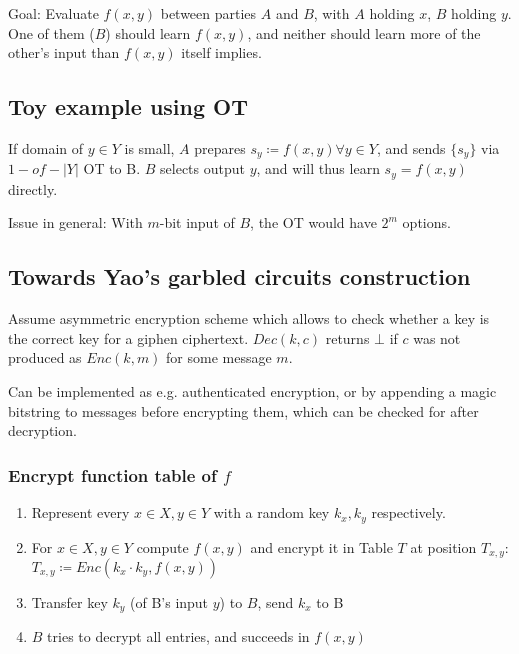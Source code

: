 Goal: Evaluate $f(x, y)$ between parties $A$ and $B$, with $A$ holding $x$, $B$
holding $y$. One of them ($B$) should learn $f(x, y)$, and neither should learn
more of the other's input than $f(x, y)$ itself implies.

\subsection{Toy example using OT}

If domain of $y \in Y$ is small, $A$ prepares $s_y \coloneqq f(x, y) \forall y
\in Y$, and sends $\{s_y\}$ via $1-of-|Y|$ OT to B. $B$ selects output $y$, and
will thus learn $s_y = f(x, y)$ directly.

Issue in general: With $m$-bit input of $B$, the OT would have $2^m$ options.

\subsection{Towards Yao's garbled circuits construction}

Assume asymmetric encryption scheme which allows to check whether a key is the
correct key for a giphen ciphertext. $Dec(k, c)$ returns $\bot$ if $c$ was not
produced as $Enc(k, m)$ for some message $m$.

Can be implemented as e.g. authenticated encryption, or by appending a magic
bitstring to messages before encrypting them, which can be checked for after
decryption.

\subsubsection{Encrypt function table of $f$}

\begin{enumerate}
		\item Represent every $x \in X, y \in Y$ with a random key $k_x, k_y$ respectively.
		\item For $x \in X, y \in Y$ compute $f(x, y)$ and encrypt it in Table
				$T$ at position $T_{x, y}$: $T_{x, y} \coloneqq Enc(k_x \cdot
				k_y, f(x, y))$
		\item Transfer key $k_y$ (of B's input $y$) to $B$, send $k_x$ to B
		\item $B$ tries to decrypt all entries, and succeeds in $f(x, y)$
\end{enumerate}

